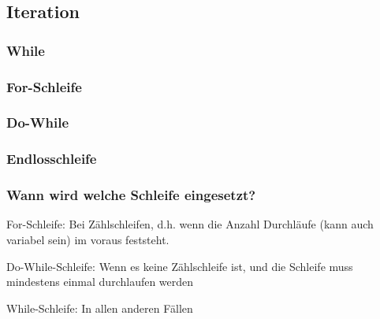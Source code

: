 	\subsection{Iteration }
		\begin{minipage}[t]{4 cm}
			\subsubsection{While}
				
		\end{minipage}
		\begin{minipage}[t]{10 cm}
			\subsubsection{For-Schleife}
				
		\end{minipage}
		\begin{minipage}[t]{5 cm}
			\subsubsection{Do-While}
				
		\end{minipage}
		
		\subsubsection{Endlosschleife}
			\begin{minipage}[c]{3 cm}
				
			\end{minipage}
			\begin{minipage}[c]{3 cm}
				
			\end{minipage}
		
		\subsubsection{Wann wird welche Schleife eingesetzt?}
			\begin{compactitem}
				\item For-Schleife: Bei Zählschleifen, d.h. wenn die Anzahl Durchläufe (kann auch variabel sein) im
				voraus feststeht.
				\item Do-While-Schleife: Wenn es keine Zählschleife ist, und die Schleife muss mindestens einmal
				durchlaufen werden
				\item While-Schleife: In allen anderen Fällen
			\end{compactitem}
			
